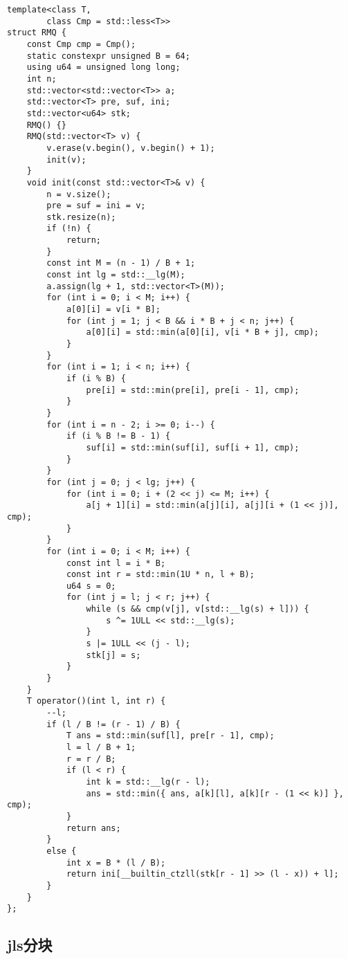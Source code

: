 \documentclass[a4paper,10pt]{article}
\begin{document}
\noindent\begin{lstlisting}
template<class T,
        class Cmp = std::less<T>>
struct RMQ {
    const Cmp cmp = Cmp();
    static constexpr unsigned B = 64;
    using u64 = unsigned long long;
    int n;
    std::vector<std::vector<T>> a;
    std::vector<T> pre, suf, ini;
    std::vector<u64> stk;
    RMQ() {}
    RMQ(std::vector<T> v) {
        v.erase(v.begin(), v.begin() + 1);
        init(v);
    }
    void init(const std::vector<T>& v) {
        n = v.size();
        pre = suf = ini = v;
        stk.resize(n);
        if (!n) {
            return;
        }
        const int M = (n - 1) / B + 1;
        const int lg = std::__lg(M);
        a.assign(lg + 1, std::vector<T>(M));
        for (int i = 0; i < M; i++) {
            a[0][i] = v[i * B];
            for (int j = 1; j < B && i * B + j < n; j++) {
                a[0][i] = std::min(a[0][i], v[i * B + j], cmp);
            }
        }
        for (int i = 1; i < n; i++) {
            if (i % B) {
                pre[i] = std::min(pre[i], pre[i - 1], cmp);
            }
        }
        for (int i = n - 2; i >= 0; i--) {
            if (i % B != B - 1) {
                suf[i] = std::min(suf[i], suf[i + 1], cmp);
            }
        }
        for (int j = 0; j < lg; j++) {
            for (int i = 0; i + (2 << j) <= M; i++) {
                a[j + 1][i] = std::min(a[j][i], a[j][i + (1 << j)], cmp);
            }
        }
        for (int i = 0; i < M; i++) {
            const int l = i * B;
            const int r = std::min(1U * n, l + B);
            u64 s = 0;
            for (int j = l; j < r; j++) {
                while (s && cmp(v[j], v[std::__lg(s) + l])) {
                    s ^= 1ULL << std::__lg(s);
                }
                s |= 1ULL << (j - l);
                stk[j] = s;
            }
        }
    }
    T operator()(int l, int r) {
        --l;
        if (l / B != (r - 1) / B) {
            T ans = std::min(suf[l], pre[r - 1], cmp);
            l = l / B + 1;
            r = r / B;
            if (l < r) {
                int k = std::__lg(r - l);
                ans = std::min({ ans, a[k][l], a[k][r - (1 << k)] }, cmp);
            }
            return ans;
        }
        else {
            int x = B * (l / B);
            return ini[__builtin_ctzll(stk[r - 1] >> (l - x)) + l];
        }
    }
};\end{lstlisting}

\subsection{jls分块}
\thispagestyle{fancy}
\end{document}

